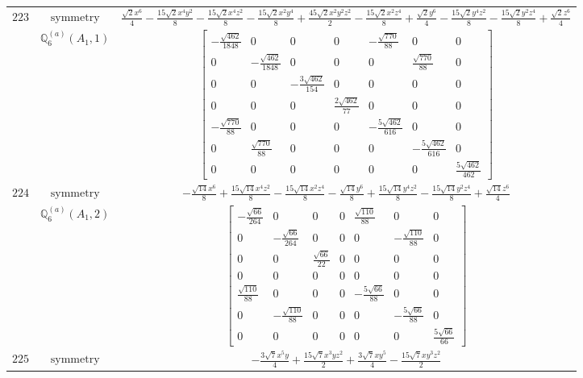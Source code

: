 \documentclass[fleqn,8pt,landscape]{jsarticle}
\begin{document}
\begin{longtable}{ccc}
$ 223 $ & $ \text{symmetry} $ & $ \frac{\sqrt{2} x^{6}}{4} - \frac{15 \sqrt{2} x^{4} y^{2}}{8} - \frac{15 \sqrt{2} x^{4} z^{2}}{8} - \frac{15 \sqrt{2} x^{2} y^{4}}{8} + \frac{45 \sqrt{2} x^{2} y^{2} z^{2}}{2} - \frac{15 \sqrt{2} x^{2} z^{4}}{8} + \frac{\sqrt{2} y^{6}}{4} - \frac{15 \sqrt{2} y^{4} z^{2}}{8} - \frac{15 \sqrt{2} y^{2} z^{4}}{8} + \frac{\sqrt{2} z^{6}}{4} $ \\
$  $ & $ \mathbb{Q}_{6}^{(a)}(A_{1},1) $ & $ \begin{bmatrix} - \frac{\sqrt{462}}{1848} & 0 & 0 & 0 & - \frac{\sqrt{770}}{88} & 0 & 0 \\ 0 & - \frac{\sqrt{462}}{1848} & 0 & 0 & 0 & \frac{\sqrt{770}}{88} & 0 \\ 0 & 0 & - \frac{3 \sqrt{462}}{154} & 0 & 0 & 0 & 0 \\ 0 & 0 & 0 & \frac{2 \sqrt{462}}{77} & 0 & 0 & 0 \\ - \frac{\sqrt{770}}{88} & 0 & 0 & 0 & - \frac{5 \sqrt{462}}{616} & 0 & 0 \\ 0 & \frac{\sqrt{770}}{88} & 0 & 0 & 0 & - \frac{5 \sqrt{462}}{616} & 0 \\ 0 & 0 & 0 & 0 & 0 & 0 & \frac{5 \sqrt{462}}{462} \end{bmatrix} $ \\ \hline
$ 224 $ & $ \text{symmetry} $ & $ - \frac{\sqrt{14} x^{6}}{8} + \frac{15 \sqrt{14} x^{4} z^{2}}{8} - \frac{15 \sqrt{14} x^{2} z^{4}}{8} - \frac{\sqrt{14} y^{6}}{8} + \frac{15 \sqrt{14} y^{4} z^{2}}{8} - \frac{15 \sqrt{14} y^{2} z^{4}}{8} + \frac{\sqrt{14} z^{6}}{4} $ \\
$  $ & $ \mathbb{Q}_{6}^{(a)}(A_{1},2) $ & $ \begin{bmatrix} - \frac{\sqrt{66}}{264} & 0 & 0 & 0 & \frac{\sqrt{110}}{88} & 0 & 0 \\ 0 & - \frac{\sqrt{66}}{264} & 0 & 0 & 0 & - \frac{\sqrt{110}}{88} & 0 \\ 0 & 0 & \frac{\sqrt{66}}{22} & 0 & 0 & 0 & 0 \\ 0 & 0 & 0 & 0 & 0 & 0 & 0 \\ \frac{\sqrt{110}}{88} & 0 & 0 & 0 & - \frac{5 \sqrt{66}}{88} & 0 & 0 \\ 0 & - \frac{\sqrt{110}}{88} & 0 & 0 & 0 & - \frac{5 \sqrt{66}}{88} & 0 \\ 0 & 0 & 0 & 0 & 0 & 0 & \frac{5 \sqrt{66}}{66} \end{bmatrix} $ \\ \hline
$ 225 $ & $ \text{symmetry} $ & $ - \frac{3 \sqrt{7} x^{5} y}{4} + \frac{15 \sqrt{7} x^{3} y z^{2}}{2} + \frac{3 \sqrt{7} x y^{5}}{4} - \frac{15 \sqrt{7} x y^{3} z^{2}}{2} $ \\

\end{longtable}
\end{document}

